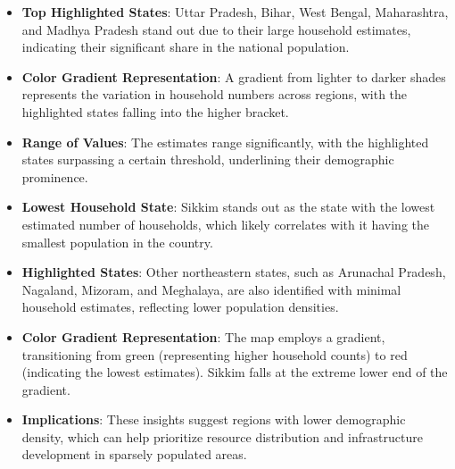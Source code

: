 \documentclass{article}
\begin{document}
\begin{itemize}
	\item \textbf{Top Highlighted States}: Uttar Pradesh, Bihar, West Bengal, Maharashtra, and Madhya Pradesh stand out due to their large household estimates, indicating their significant share in the national population.
	\item \textbf{Color Gradient Representation}: A gradient from lighter to darker shades represents the variation in household numbers across regions, with the highlighted states falling into the higher bracket.
	\item \textbf{Range of Values}: The estimates range significantly, with the highlighted states surpassing a certain threshold, underlining their demographic prominence.
\end{itemize}






	\begin{itemize}
	\item \textbf{Lowest Household State}: Sikkim stands out as the state with the lowest estimated number of households, which likely correlates with it having the smallest population in the country.
	\item \textbf{Highlighted States}: Other northeastern states, such as Arunachal Pradesh, Nagaland, Mizoram, and Meghalaya, are also identified with minimal household estimates, reflecting lower population densities.	

	
	

		\item \textbf{Color Gradient Representation}: The map employs a gradient, transitioning from green (representing higher household counts) to red (indicating the lowest estimates). Sikkim falls at the extreme lower end of the gradient.
		\item \textbf{Implications}: These insights suggest regions with lower demographic density, which can help prioritize resource distribution and infrastructure development in sparsely populated areas.
	\end{itemize}
	
\end{document}
